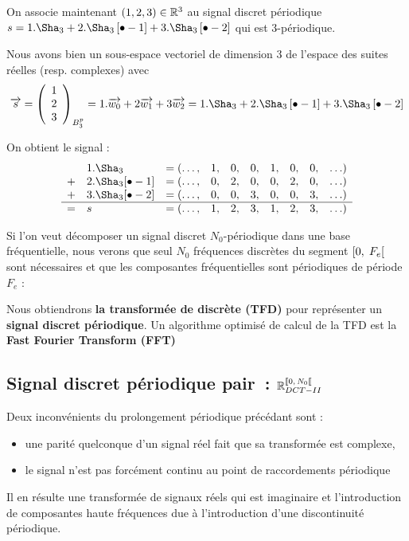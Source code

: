\begin{exemple}
  
  On associe maintenant $(1, 2, 3)\in\mathbb{R}^3$ au signal discret
  périodique
  $s=1.\Sha_{3}+2.\Sha_{3}\b{\bullet-1}+3.\Sha_{3}\b{\bullet-2}$ qui
  est 3-périodique.

  Nous avons bien un sous-espace vectoriel de
  dimension 3 de l'espace des suites réelles (resp. complexes) avec
  $$\vec{s} = \vvvectBase{1}{2}{3}{B_3^p} = 1.\vec{w_0}+2\vec{w_1}+3\vec{w_2} = 1.\Sha_{3}+2.\Sha_{3}\b{\bullet-1}+3.\Sha_{3}\b{\bullet-2}$$

  On obtient le signal :
  $$
  \begin{array}{llcccccccc}
     &1.\Sha_{3}            & =(\ldots, &1 , &0, &0, &1, &0, &0, &\ldots)\\
    +&2.\Sha_{3}[\bullet-1] & =(\ldots, &0 , &2, &0, &0, &2, &0, &\ldots)\\
    +&3.\Sha_{3}[\bullet-2] & =(\ldots, &0 , &0, &3, &0, &0, &3, &\ldots)\\\hline
    =& s  & =(\ldots, &1 , &2, &3, &1, &2, &3, &\ldots)
  \end{array}
  $$
\end{exemple}

\begin{remarque}
  Si l'on veut décomposer un signal discret $N_0$-périodique dans une
  base fréquentielle, nous verons que seul $N_0$ fréquences discrètes
  du segment $\left[0,\;F_e\right[$ sont nécessaires et que les composantes
  fréquentielles sont périodiques de période $F_e$ :


  Nous obtiendrons \textbf{la transformée de \Fourier{} discrète (TFD)}
  pour représenter un \textbf{signal discret périodique}. Un algorithme
  optimisé de calcul de la TFD est la \textbf{Fast Fourier Transform
    (FFT)}
\end{remarque}

\subsection{Signal discret périodique pair~: $\RNdctII$}
Deux inconvénients du  prolongement périodique précédant sont :
\begin{itemize}
  \item une parité quelconque d'un signal  réel fait que sa transformée est complexe,
  \item le signal n'est pas forcément continu au point de raccordements périodique
\end{itemize}
Il en résulte une transformée de signaux réels qui est imaginaire et l'introduction de composantes haute fréquences due à l'introduction d'une discontinuité périodique.

